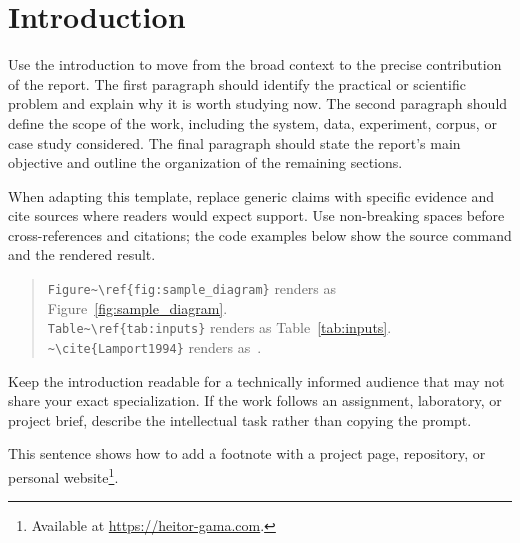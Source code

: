 \documentclass[a4paper,11pt]{report}
\begin{document}
\restoregeometry

\clearpage
{}
\pagestyle{empty}
\vspace{1em}
\makeatletter
{}
\makeatother
\restoregeometry

\newpage
\hypersetup{pageanchor=true}
\pagestyle{fancy}
\setcounter{page}{1}


\section*{Introduction}

Use the introduction to move from the broad context to the precise contribution of the report. The first paragraph should identify the practical or scientific problem and explain why it is worth studying now. The second paragraph should define the scope of the work, including the system, data, experiment, corpus, or case study considered. The final paragraph should state the report's main objective and outline the organization of the remaining sections.

When adapting this template, replace generic claims with specific evidence and cite sources where readers would expect support. Use non-breaking spaces before cross-references and citations; the code examples below show the source command and the rendered result.

\begin{quote}\small
\verb|Figure~\ref{fig:sample_diagram}| renders as Figure~\ref{fig:sample_diagram}.\\
\verb|Table~\ref{tab:inputs}| renders as Table~\ref{tab:inputs}.\\
\verb|~\cite{Lamport1994}| renders as~\cite{Lamport1994}.
\end{quote}

Keep the introduction readable for a technically informed audience that may not share your exact specialization. If the work follows an assignment, laboratory, or project brief, describe the intellectual task rather than copying the prompt.

This sentence shows how to add a footnote with a project page, repository, or personal website\footnote{Available at \url{https://heitor-gama.com}.}.
\end{document}
